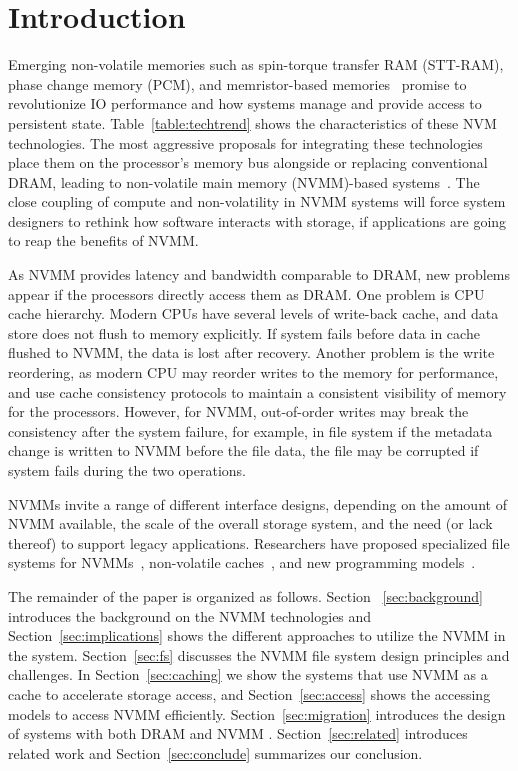 \section{Introduction}
\label{sec:introduction}

Emerging non-volatile memories such as spin-torque transfer RAM (STT-RAM),
phase change memory (PCM), and
memristor-based memories~\cite{moneta, monetad, quicksan,Onyx,
pollisbetterthaninterrupt}
promise to revolutionize IO performance and how
systems manage and provide access to persistent state. Table~\ref{table:techtrend}
shows the characteristics of these NVM technologies. The most aggressive
proposals for integrating these technologies place them on the processor's
memory bus alongside or replacing conventional DRAM, leading to non-volatile
main memory (NVMM)-based systems~\cite{PCM_EfficientMainMemory,
PCMHierarchy,eNVy,WSP}. The close coupling of compute and
non-volatility in NVMM systems will force system designers to rethink how
software interacts with storage, if applications are going to reap the benefits of NVMM.

As NVMM provides latency and bandwidth comparable to DRAM, new problems
appear if the processors directly access them as DRAM. One problem is 
CPU cache hierarchy. Modern CPUs have several levels of write-back cache,
 and data store does not flush to memory explicitly. If system fails before
data in cache flushed to NVMM, the data is lost after recovery. Another
problem is the write reordering, as modern CPU may reorder writes to the
memory for performance, and use cache consistency protocols to maintain
a consistent visibility of memory for the processors. However, for NVMM,
out-of-order writes may break the consistency after the system failure,
for example, in file system if the metadata change is written to NVMM before
the file data, the file may be corrupted if system fails during the two 
operations. 

NVMMs invite a range of different interface designs, depending on the amount of
NVMM available, the scale of the overall storage system, and the need (or lack
thereof) to support legacy applications.  Researchers have proposed specialized
file systems for NVMMs~\cite{PMFS,BPFS}, non-volatile
caches~\cite{RVM,riovista}, and new programming
models~\cite{nvheaps,mnemosyne}.

The remainder of the paper is organized as follows. Section
~\ref{sec:background} introduces the background on the NVMM technologies
and Section~\ref{sec:implications} shows the different approaches to utilize
the NVMM in the system.
Section~\ref{sec:fs} discusses the NVMM file system design principles and
challenges.
In Section~\ref{sec:caching} we show the systems that use NVMM as a cache
to accelerate storage access, and
Section~\ref{sec:access} shows the accessing models to access NVMM
efficiently.
Section~\ref{sec:migration} introduces the design of systems with both DRAM and NVMM
. Section~\ref{sec:related} introduces
related work and Section~\ref{sec:conclude} summarizes our conclusion.




